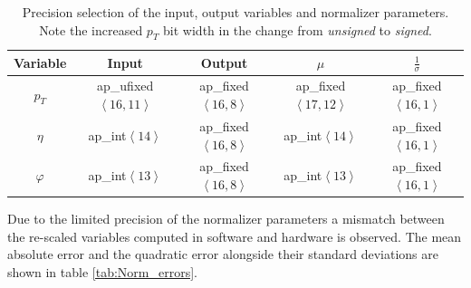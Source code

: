 \documentclass[../../main.tex]{subfiles}
\begin{document}
\begin{center}
    \begin{table}[h]
    \centering
    \begin{tabular}{|c|c|c|c|c|}
        \hline
        Variable & Input  & Output & $\mu$ & $\frac{1}{\sigma}$  \\ 
        \hline \hline
        $p_T$ & ap\_ufixed$\left<16,11\right>$    & ap\_fixed$\left<16,8\right>$ & ap\_fixed$\left<17,12\right>$  & ap\_fixed$\left<16,1\right>$       \\
        $\eta$ & ap\_int$\left<14\right>$    & ap\_fixed$\left<16,8\right>$ & ap\_int$\left<14\right>$  & ap\_fixed$\left<16,1\right>$       \\
        $\varphi$ & ap\_int$\left<13\right>$   & ap\_fixed$\left<16,8\right>$ & ap\_int$\left<13\right>$  & ap\_fixed$\left<16,1\right>$       \\
        \hline
    \end{tabular}
    \caption{Precision selection of the input, output variables and normalizer parameters. Note the increased $p_T$ bit width in the change from \textit{unsigned} to \textit{signed}.}
    \label{tab:Norm_precision}
    \end{table}
\end{center}

Due to the limited precision of the normalizer parameters a mismatch between the re-scaled variables computed in software and hardware is observed. The mean absolute error and the quadratic error alongside their standard deviations are shown in table \ref{tab:Norm_errors}.  
\end{document}
